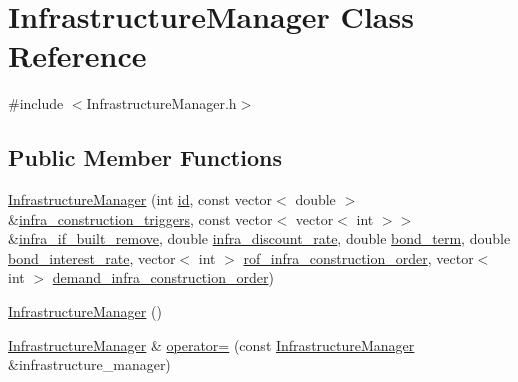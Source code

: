 \hypertarget{classInfrastructureManager}{}\section{Infrastructure\+Manager Class Reference}
\label{classInfrastructureManager}


{\ttfamily \#include $<$Infrastructure\+Manager.\+h$>$}

\subsection*{Public Member Functions}
\begin{DoxyCompactItemize}
\item 
\mbox{\hyperlink{classInfrastructureManager_a2720f467b660e0f63f265e7957ca0139_a2720f467b660e0f63f265e7957ca0139}{Infrastructure\+Manager}} (int \mbox{\hyperlink{classInfrastructureManager_a9c721676ab3c35a247c818bf34fd482e_a9c721676ab3c35a247c818bf34fd482e}{id}}, const vector$<$ double $>$ \&\mbox{\hyperlink{classInfrastructureManager_a5b09482bd9fc258a3da82a86b157a2c3_a5b09482bd9fc258a3da82a86b157a2c3}{infra\+\_\+construction\+\_\+triggers}}, const vector$<$ vector$<$ int $>$$>$ \&\mbox{\hyperlink{classInfrastructureManager_a6505122b584011bd852a126616bf442a_a6505122b584011bd852a126616bf442a}{infra\+\_\+if\+\_\+built\+\_\+remove}}, double \mbox{\hyperlink{classInfrastructureManager_a44099d2523ff67773ffb853e2c9871b3_a44099d2523ff67773ffb853e2c9871b3}{infra\+\_\+discount\+\_\+rate}}, double \mbox{\hyperlink{classInfrastructureManager_a6c8010bc7c65fac8411431e5c7a8d3e4_a6c8010bc7c65fac8411431e5c7a8d3e4}{bond\+\_\+term}}, double \mbox{\hyperlink{classInfrastructureManager_ab8ddaa0ed220e29bc296470b7a905a3b_ab8ddaa0ed220e29bc296470b7a905a3b}{bond\+\_\+interest\+\_\+rate}}, vector$<$ int $>$ \mbox{\hyperlink{classInfrastructureManager_a21b02e6d9ca7f90cfb289a48cec723cb_a21b02e6d9ca7f90cfb289a48cec723cb}{rof\+\_\+infra\+\_\+construction\+\_\+order}}, vector$<$ int $>$ \mbox{\hyperlink{classInfrastructureManager_a9b2adee9527d11de87069901e86b540a_a9b2adee9527d11de87069901e86b540a}{demand\+\_\+infra\+\_\+construction\+\_\+order}})
\item 
\mbox{\hyperlink{classInfrastructureManager_a435ec4cb56238c6e1d93e37783f3a03a_a435ec4cb56238c6e1d93e37783f3a03a}{Infrastructure\+Manager}} ()
\item 
\mbox{\hyperlink{classInfrastructureManager}{Infrastructure\+Manager}} \& \mbox{\hyperlink{classInfrastructureManager_a30910bd8edf01ae2899561b49d7719c1_a30910bd8edf01ae2899561b49d7719c1}{operator=}} (const \mbox{\hyperlink{classInfrastructureManager}{Infrastructure\+Manager}} \&infrastructure\+\_\+manager)
$$
\end{DoxyCompactItemize}
